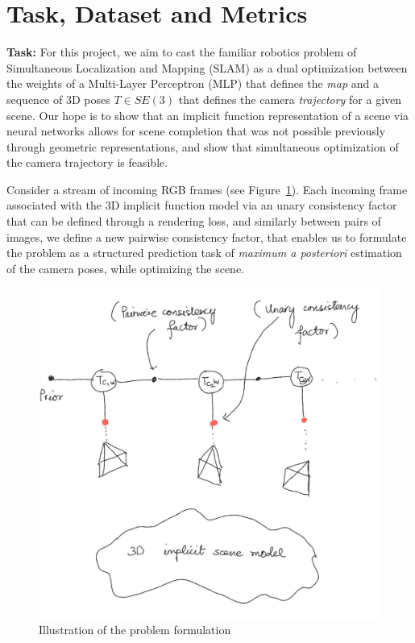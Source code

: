 \documentclass[15pt,letterpaper]{article}
\begin{document}
\section{Task, Dataset and Metrics}%
\label{sec:Task, Dataset and Metrics}
\textbf{Task:} For this project, we aim to cast the familiar robotics problem of Simultaneous Localization and Mapping (SLAM) as a dual optimization between the weights of a Multi-Layer Perceptron (MLP) that defines the \emph{map} and a sequence of 3D poses $T \in SE(3)$ that defines the camera \emph{trajectory} for a given scene. Our hope is to show that an implicit function representation of a scene via neural networks allows for scene completion that was not possible previously through geometric representations, and show that simultaneous optimization of the camera trajectory is feasible.

Consider a stream of incoming RGB frames (see Figure~\ref{fig:structured-prediction}). Each incoming frame associated with the 3D implicit function model via an unary consistency factor that can be defined through a rendering loss, and similarly between pairs of images, we define a new pairwise consistency factor, that enables us to formulate the problem as a structured prediction task of \emph{maximum a posteriori} estimation of the camera poses, while optimizing the scene.

\begin{figure}
    \centering
    \includegraphics[width=\linewidth]{structured-prediction}
    \caption{Illustration of the problem formulation}%
    \label{fig:structured-prediction}
\end{figure}
\end{document}
